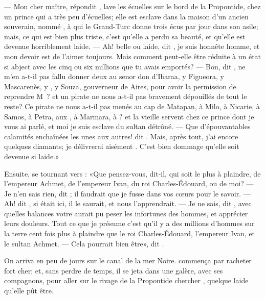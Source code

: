 — Mon cher maître, répondit ,  lave les écuelles sur le
bord de la Propontide, chez un prince qui a très peu d’écuelles; elle
est esclave dans la maison d’un ancien souverain, nommé , à
qui le Grand-Turc donne trois écus par jour dans son asile; mais, ce
qui est bien plus triste, c’est qu’elle a perdu sa beauté, et qu’elle
est devenue horriblement laide. — Ah! belle ou laide, dit , je
suis honnête homme, et mon devoir est de l’aimer toujours. Mais comment
peut-elle être réduite à un état si abject avec les cinq ou six
millions que tu avais emportés? — Bon, dit , ne m’en a-t-il pas
fallu donner deux au senor don  d’Ibaraa, y Figueora, y
Mascarenès, y , y Souza, gouverneur de  Aires, pour
avoir la permission de reprendre M~? et un pirate
ne nous a-t-il pas bravement dépouillés de tout le reste? Ce pirate ne
nous a-t-il pas menés au cap de Matapan, à Milo, à Nicarie, à Samos, à
Petra, aux , à Marmara, à ?  et la vieille
servent chez ce prince dont je vous ai parlé, et moi je suis esclave du
sultan détrôné. — Que d’épouvantables calamités enchaînées les unes aux
autres! dit . Mais, après tout, j’ai encore quelques diamants;
je délivrerai aisément . C’est bien dommage qu’elle soit
devenue si laide.»



Ensuite, se tournant vers : «Que pensez-vous, dit-il, qui soit le
plus à plaindre, de l’empereur Achmet, de l’empereur Ivan, du roi
Charles-Édouard, ou de moi? — Je n’en sais rien, dit ; il faudrait
que je fusse dans vos cœurs pour le savoir. — Ah! dit , si
 était ici, il le saurait, et nous l’apprendrait. — Je ne sais,
dit , avec quelles balances votre  aurait pu peser les
infortunes des hommes, et apprécier leurs douleurs. Tout ce que je
présume c’est qu’il y a des millions d’hommes sur la terre cent fois
plus à plaindre que le roi Charles-Édouard, l’empereur Ivan, et le
sultan Achmet. — Cela pourrait bien être», dit .

On arriva en peu de jours sur le canal de la mer Noire. 
commença par racheter  fort cher; et, sans perdre de temps, il
se jeta dans une galère, avec ses compagnons, pour aller sur le rivage
de la Propontide chercher , quelque laide qu’elle pût être.


